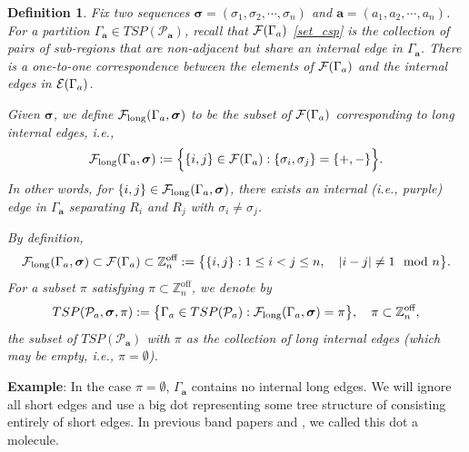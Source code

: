 \documentclass[10pt,reqno]{article}
\theoremstyle{plain} %
\newtheorem{definition}[theorem]{Definition}
\theoremstyle{remark}
\numberwithin{equation}{section}
\begin{document}
 
 

\begin{definition} 
Fix two sequences \(\boldsymbol{\sigma} = (\sigma_1, \sigma_2, \cdots, \sigma_n)\) and \(\textbf{a} = (a_1, a_2, \cdots, a_n)\). For a partition \(\Gamma_{\textbf{a}} \in TSP(\mathcal{P}_{\textbf{a}})\), recall that  \({\cal F}(\Gamma_{\textbf{a}})\) \eqref{set_csp} is  the collection of pairs of sub-regions that are non-adjacent but share an internal edge in \(\Gamma_{\textbf{a}}\). There is a one-to-one correspondence between the elements of \({\cal F}(\Gamma_{\textbf{a}})\) and the internal edges in \({\cal E}(\Gamma_{\textbf{a}})\).

Given \(\boldsymbol{\sigma}\), we define \({\cal F}_{\text{long}}(\Gamma_{\textbf{a}}, \boldsymbol{\sigma})\) to be  the subset of \({\cal F}(\Gamma_{\textbf{a}})\) corresponding to long internal edges, i.e., 
\[
{\cal F}_{\text{long}}(\Gamma_{\textbf{a}}, \boldsymbol{\sigma}) := \Big\{\{i, j\} \in {\cal F}(\Gamma_{\textbf{a}}) : \{\sigma_i, \sigma_j\} = \{+, -\}\Big\}.
\]
In other words, for \(\{i, j\} \in {\cal F}_{\text{long}}(\Gamma_{\textbf{a}}, \boldsymbol{\sigma})\), there exists an internal (i.e., purple) edge in \(\Gamma_{\textbf{a}}\) separating \(R_i\) and \(R_j\) with \(\sigma_i \neq \sigma_j\).

By definition, 
\[
{\cal F}_{\text{long}}(\Gamma_{\textbf{a}}, \boldsymbol{\sigma}) \subset {\cal F}(\Gamma_{\textbf{a}}) \subset \mathbb{Z}_n^{\text{off}} := \big\{\{i, j\} : 1 \leq i < j \leq n, \quad |i - j| \neq 1 \mod n\big\}.
\]
For a subset \(\pi\) satisfying \(\pi \subset \mathbb{Z}_n^{\text{off}}\), we denote by 
\[
TSP(\mathcal{P}_{\textbf{a}}, \boldsymbol{\sigma}, \pi) := \big\{\Gamma_{\textbf{a}} \in TSP(\mathcal{P}_{\textbf{a}}) : {\cal F}_{\text{long}}(\Gamma_{\textbf{a}}, \boldsymbol{\sigma}) = \pi\big\}, \quad \pi \subset \mathbb{Z}_n^{\text{off}},
\]
the subset of \(TSP(\mathcal{P}_{\textbf{a}})\) with \(\pi\) as the collection of long internal  edges (which may be empty, i.e., \(\pi = \emptyset\)).
\end{definition}


\noindent 
{\bf Example}: In the case  $\pi=\emptyset$,    $\Gamma_\textbf{a}$ contains  no internal long edges. We will ignore all  short edges
and use a big dot representing  some tree structure of consisting entirely of short edges. 
In previous band papers \cite{yang2021delocalization} and \cite{yang2022delocalization}, we  called this dot a  molecule. 
\end{document}
